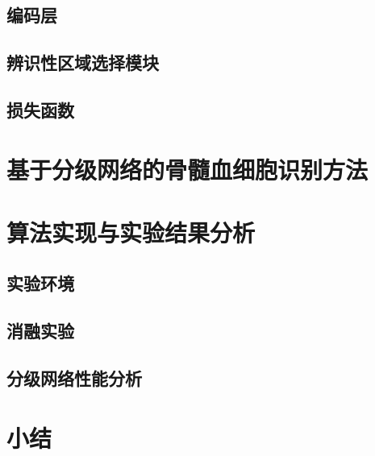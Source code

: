 \subsection{编码层}
\subsection{辨识性区域选择模块}
\subsection{损失函数}

\section{基于分级网络的骨髓血细胞识别方法}

\section{算法实现与实验结果分析}
\subsection{实验环境}
\subsection{消融实验}
\subsection{分级网络性能分析}
\section{小结}